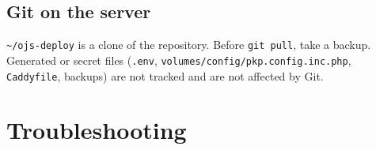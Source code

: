 \documentclass[11pt,a4paper]{report}
\newcommand{\code}[1]{\texttt{\small #1}}
\newcommand{\file}[1]{\texttt{\small #1}}
\begin{document}
\section{Git on the server}
\file{\textasciitilde/ojs-deploy} is a clone of the repository. Before \code{git pull}, take a
backup. Generated or secret files (\file{.env}, \file{volumes/config/\allowbreak pkp.config.inc.php},
\file{Caddyfile}, backups) are not tracked and are not affected by Git.

\chapter{Troubleshooting}\label{ch:trouble}
\end{document}
